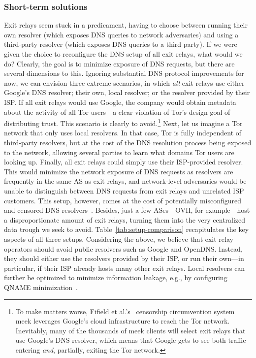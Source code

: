 \subsubsection{Short-term solutions}
\label{sec:short-term}
Exit relays seem stuck in a predicament, having to choose between running their
own resolver (which exposes DNS queries to network adversaries) and using a
third-party resolver (which exposes DNS queries to a third party).  If we were
given the choice to reconfigure the DNS setup of all exit relays, what would we
do?  Clearly, the goal is to minimize exposure of DNS requests, but there are
several dimensions to this.  Ignoring substantial DNS protocol improvements for
now, we can envision three extreme scenarios, in which \emph{all} exit relays
use either \first Google's DNS resolver; \second their own, local resolver; or
\third the resolver provided by their ISP.  If all exit relays would use Google,
the company would obtain metadata about the activity of all Tor users---a clear
violation of Tor's design goal of distributing trust.  This scenario is clearly
to avoid.\footnote{To make matters worse, Fifield et al.'s~\cite{Fifield2015a}
censorship circumvention system meek leverages Google's cloud infrastructure
to reach the Tor network.  Inevitably, many of the thousands of meek clients
will select exit relays that use Google's DNS resolver, which means that Google
gets to see both traffic entering \emph{and}, partially, exiting the Tor
network.} Next, let us imagine a Tor network that only uses local resolvers.  In
that case, Tor is fully independent of third-party resolvers, but at the cost of
the DNS resolution process being exposed to the network, allowing several
parties to learn what domains Tor users are looking up.  Finally, all exit
relays could simply use their ISP-provided resolver.  This would minimize the
network exposure of DNS requests as resolvers are frequently in the same AS as
exit relays, and network-level adversaries would be unable to distinguish
between DNS requests from exit relays and unrelated ISP customers.  This setup,
however, comes at the cost of potentially misconfigured and censored DNS
resolvers~\cite[\S~4.1]{Winter2014b}.  Besides, just a few ASes---OVH, for
example---host a disproportionate amount of exit relays, turning them into the
very centralized data trough we seek to avoid.  Table~\ref{tab:setup-comparison}
recapitulates the key aspects of all three setups.  Considering the above, we
believe that exit relay operators should avoid public resolvers such as Google
and OpenDNS.  Instead, they should either use the resolvers provided by their
ISP, or run their own---in particular, if their ISP already hosts many other
exit relays.  Local resolvers can further be optimized to minimize information
leakage, e.g., by configuring QNAME minimization~\cite{qname-minimization}.

